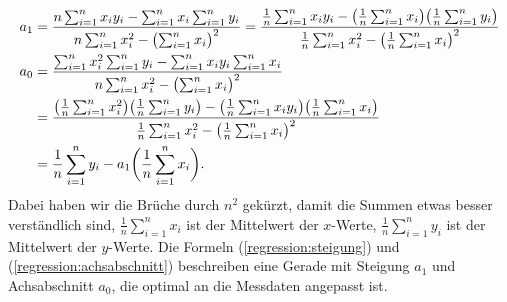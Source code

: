 \begin{align}
a_1
&=
\frac{n\sum_{i=1}^nx_iy_i-\sum_{i=1}^n x_i\sum_{i=1}^ny_i}%
{n\sum_{i=1}^nx_i^2-\bigl(\sum_{i=1}^nx_i\bigr)^2}
=
\frac{\frac1n\sum_{i=1}^nx_iy_i-\bigl(\frac1n\sum_{i=1}^n x_i\bigr)\bigl(\frac1n \sum_{i=1}^ny_i\bigr)}%
{\frac1n\sum_{i=1}^nx_i^2-\bigl(\frac1n\sum_{i=1}^nx_i\bigr)^2}
\label{regression:steigung}
\\
a_0
&=
\frac{\sum_{i=1}^nx_i^2\sum_{i=1}^n y_i-\sum_{i=1}^n x_iy_i\sum_{i=1}^n x_i }%
{n\sum_{i=1}^nx_i^2-\bigl(\sum_{i=1}^nx_i\bigr)^2}
\notag
\\
&=
\frac{\bigl(\frac1n\sum_{i=1}^nx_i^2\bigr)\bigl(\frac1n\sum_{i=1}^n y_i\bigr)
-\bigl(\frac1n\sum_{i=1}^n x_iy_i\bigr)\bigl(\frac1n\sum_{i=1}^n x_i\bigr) }%
{\frac1n\sum_{i=1}^nx_i^2-\bigl(\frac1n\sum_{i=1}^nx_i\bigr)^2}
\notag
\\
&=
\frac1n\sum_{i=1}^n y_i
-
a_1\biggl(\frac1n\sum_{i=1}^n x_i\biggr).
\label{regression:achsabschnitt}
\end{align}
Dabei haben wir die Brüche durch $n^2$ gekürzt, damit die Summen
etwas besser verständlich sind, 
$\frac1n\sum_{i=1}^nx_i$ ist der Mittelwert der $x$-Werte,
$\frac1n\sum_{i=1}^ny_i$ ist der Mittelwert der $y$-Werte.
Die Formeln (\ref{regression:steigung}) und (\ref{regression:achsabschnitt})
beschreiben eine Gerade mit Steigung $a_1$ und Achsabschnitt $a_0$,
die optimal an die Messdaten angepasst ist.


